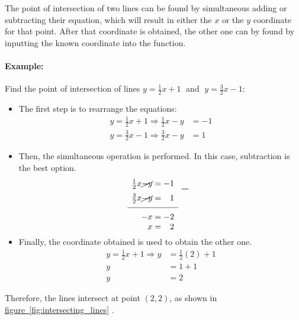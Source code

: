 \documentclass[a5paper,9pt]{book}
\theoremstyle{definition}
\newcommand{\Rarr}{\Rightarrow}
\newcommand{\fig}[2]{%
    \hyperref[#2]{#1~\ref*{#2}}%
}
\begin{document}
        The point of intersection of two lines can be found by simultaneous adding or
        subtracting their equation, which will result in either the $x$ or the $y$ coordinate
        for that point. After that coordinate is obtained, the other one can by found
        by inputting the known coordinate into the function.

        \paragraph{Example:} Find the point of intersection of lines $y=\frac{1}{2}x+1\;$
        and $\;y=\frac{3}{2}x-1$:

        \begin{itemize}
            \item The first step is to rearrange the equations:
            \begin{align*}
                y = \frac{1}{2}x+1 \Rarr \frac{1}{2}x - y &= -1 \\[5pt]
                y = \frac{3}{2}x-1 \Rarr \frac{3}{2}x - y &= 1
            \end{align*}
            \item Then, the simultaneous operation is performed. In this case, subtraction
            is the best option.
                \[
                \begin{array}{rl}
                    \frac{1}{2}x\cancel{-y}=-1 & \multirow{2}{*}{\Large $\!-$} \\[5.5pt]
                    \frac{3}{2}x\cancel{-y}=\phantom{-}1 & \\[5pt]
                    \cline{1-1}
                    \multirow{2}{*}{\(-x=-2\)} & \\
                    \multirow{2}{*}{\(x=\phantom{-}2\)}\\
                \end{array}
                \]
            \item Finally, the coordinate obtained is used to obtain the other one.
                \begin{align*}
                    y=\frac{1}{2}x+1 \Rarr y &= \frac{1}{2}(2)+1 \\[5pt]
                    y &= 1+1 \\
                    y &= 2
                \end{align*}
        \end{itemize}

        Therefore, the lines intersect at point $(2,2)$, as shown in \fig{figure}{fig:intersecting_lines}.
\end{document}
